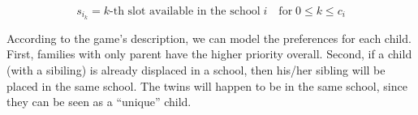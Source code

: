\documentclass{article}
\begin{document}
\begin{equation*}
    s_{i_{k}} = k\textrm{-th slot available in the school} \; i \quad \textrm{for} \; 0 \le k \le c_i
\end{equation*}

\noindent According to the game's description, we can model the preferences for each child. First, families with only parent have the higher priority overall. Second, if a child (with a sibiling) is already displaced in 
a school, then his/her sibling will be placed in the same school. The twins will happen to be in the same school, since they can be seen as a ``unique'' child.
\end{document}
